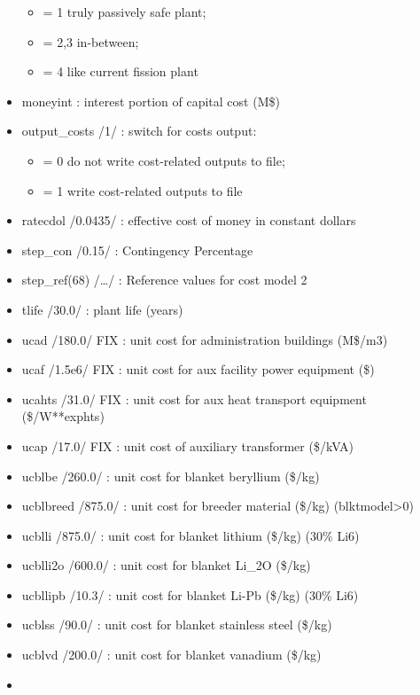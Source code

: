 \documentclass[]{article}
\providecommand{\tightlist}{%
  \setlength{\itemsep}{0pt}\setlength{\parskip}{0pt}}
\begin{document}
\begin{itemize}
  \begin{itemize}
  \tightlist
  \item
    = 1 truly passively safe plant;
  \item
    = 2,3 in-between;
  \item
    = 4 like current fission plant
  \end{itemize}
\item
  moneyint : interest portion of capital cost (M\$)
\item
  output\_costs /1/ : switch for costs output:

  \begin{itemize}
  \tightlist
  \item
    = 0 do not write cost-related outputs to file;
  \item
    = 1 write cost-related outputs to file
  \end{itemize}
\item
  ratecdol /0.0435/ : effective cost of money in constant dollars
\item
  step\_con /0.15/ : Contingency Percentage
\item
  step\_ref(68) /\ldots{}/ : Reference values for cost model 2
\item
  tlife /30.0/ : plant life (years)
\item
  ucad /180.0/ FIX : unit cost for administration buildings (M\$/m3)
\item
  ucaf /1.5e6/ FIX : unit cost for aux facility power equipment (\$)
\item
  ucahts /31.0/ FIX : unit cost for aux heat transport equipment
  (\$/W**exphts)
\item
  ucap /17.0/ FIX : unit cost of auxiliary transformer (\$/kVA)
\item
  ucblbe /260.0/ : unit cost for blanket beryllium (\$/kg)
\item
  ucblbreed /875.0/ : unit cost for breeder material (\$/kg)
  (blktmodel\textgreater{}0)
\item
  ucblli /875.0/ : unit cost for blanket lithium (\$/kg) (30\% Li6)
\item
  ucblli2o /600.0/ : unit cost for blanket Li\_2O (\$/kg)
\item
  ucbllipb /10.3/ : unit cost for blanket Li-Pb (\$/kg) (30\% Li6)
\item
  ucblss /90.0/ : unit cost for blanket stainless steel (\$/kg)
\item
  ucblvd /200.0/ : unit cost for blanket vanadium (\$/kg)
\item

\end{itemize}
\end{document}
